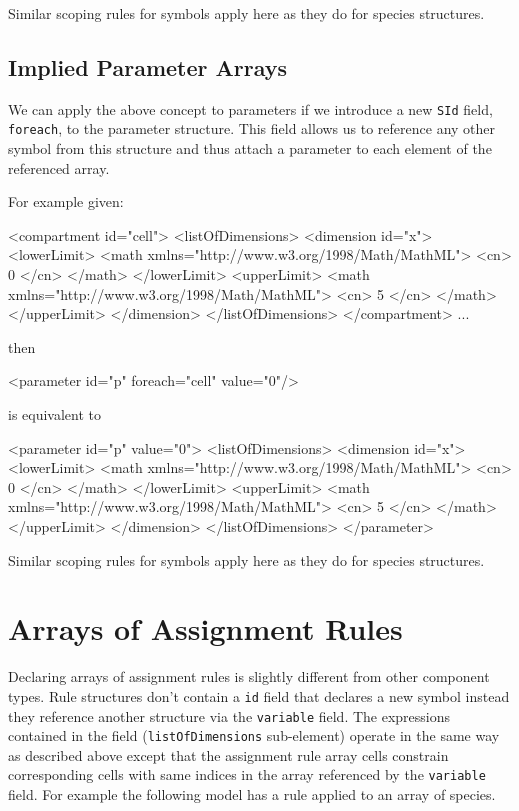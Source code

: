 \documentclass{cekarticle}
\begin{document}
Similar scoping rules for symbols apply here as they do for species structures.

\subsection{Implied Parameter Arrays}

We can apply the above concept to parameters if we introduce a
new \texttt{SId} field, \texttt{foreach}, to the parameter
structure. This field allows us to reference any other symbol
from this structure and thus attach a parameter to each element
of the referenced array.

For example given:
\begin{example}
<compartment id="cell">
    <listOfDimensions>
        <dimension id="x">
            <lowerLimit>
                <math xmlns="http://www.w3.org/1998/Math/MathML">
                    <cn> 0 </cn>
                </math>
            </lowerLimit>
            <upperLimit>
                <math xmlns="http://www.w3.org/1998/Math/MathML">
                    <cn> 5 </cn>
                </math>
            </upperLimit>
        </dimension>
    </listOfDimensions>
</compartment>
...
\end{example}
then
\begin{example}
<parameter id="p" foreach="cell" value="0"/>
\end{example}
is equivalent to
\begin{example}
<parameter id="p" value="0">
    <listOfDimensions>
        <dimension id="x">
            <lowerLimit>
                <math xmlns="http://www.w3.org/1998/Math/MathML">
                    <cn> 0 </cn>
                </math>
            </lowerLimit>
            <upperLimit>
                <math xmlns="http://www.w3.org/1998/Math/MathML">
                    <cn> 5 </cn>
                </math>
            </upperLimit>
        </dimension>
    </listOfDimensions>
</parameter>
\end{example}

Similar scoping rules for symbols apply here as they do for species structures.

\section{Arrays of Assignment Rules}

Declaring arrays of assignment rules is slightly different from other component types.
Rule structures don't contain a \texttt{id}
field that declares a new symbol instead they reference another
structure via the \texttt{variable} field.  The
expressions contained in the  field
(\texttt{listOfDimensions} sub-element) operate in the same way as described above except
that the assignment rule array cells constrain corresponding cells with same indices
in the array referenced by the \texttt{variable} field.
For example the following model has a rule applied to an array of species.
\end{document}

